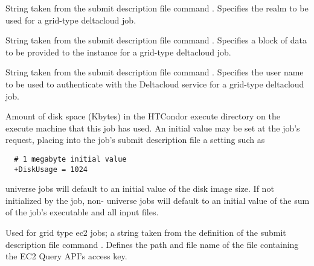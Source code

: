 \begin{description}
\item[\AdAttr{DeltacloudRealmId}:] 
String taken from the submit description file command
.
Specifies the realm to be used for a grid-type deltacloud job.

\item[\AdAttr{DeltacloudUserData}:] 
String taken from the submit description file command
.
Specifies a block of data to be provided to the instance
for a grid-type deltacloud job.

\item[\AdAttr{DeltacloudUsername}:] 
String taken from the submit description file command
.
Specifies the user name to be used to authenticate
with the Deltacloud service for a grid-type deltacloud job.

\item[\AdAttr{DiskUsage}:] Amount of disk space (Kbytes) in the HTCondor
execute directory on the execute machine that this job has used.
An initial value may be set at the job's request, placing into the
job's submit description file a setting such as
\begin{verbatim}
  # 1 megabyte initial value
  +DiskUsage = 1024
\end{verbatim}
 universe jobs will default to an initial value of the disk
image size. 
If not initialized by the job,
non- universe jobs will default to an initial value of the 
sum of the job's executable and all input files.

\item[\AdAttr{EC2AccessKeyId}:] 
Used for grid type ec2 jobs;
a string taken from the definition of the submit description file command
.
Defines the path and file name of the file containing the EC2 Query API's
access key.


\end{description}
